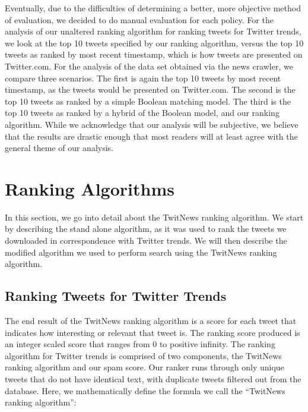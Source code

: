 \documentclass[10pt]{proc}
\begin{document}
  Eventually, due to the difficulties of determining a better, more objective method of evaluation, we decided to do manual evaluation for each policy. For the analysis of our unaltered ranking algorithm for ranking tweets for Twitter trends, we look at the top 10 tweets specified by our ranking algorithm, versus the top 10 tweets as ranked by most recent timestamp, which is how tweets are presented on Twitter.com. For the analysis of the data set obtained via the news crawler, we compare three scenarios. The first is again the top 10 tweets by most recent timestamp, as the tweets would be presented on Twitter.com. The second is the top 10 tweets as ranked by a simple Boolean matching model. The third is the top 10 tweets as ranked by a hybrid of the Boolean model, and our ranking algorithm. While we acknowledge that our analysis will be subjective, we believe that the results are drastic enough that most readers will at least agree with the general theme of our analysis.

\section{Ranking Algorithms}
  
  In this section, we go into detail about the TwitNews ranking algorithm. We start by describing the stand alone algorithm, as it was used to rank the tweets we downloaded in correspondence with Twitter trends. We will then describe the modified algorithm we used to perform search using the TwitNews ranking algorithm.
  
  \subsection{Ranking Tweets for Twitter Trends}
  The end result of the TwitNews ranking algorithm is a score for each tweet that indicates how interesting or relevant that tweet is. The ranking score produced is an integer scaled score that ranges from 0 to positive infinity.  The ranking algorithm for Twitter trends is comprised of two components, the TwitNews ranking algorithm and our spam score.  Our ranker runs through only unique tweets that do not have identical text, with duplicate tweets filtered out from the database. Here, we mathematically define the formula we call the ``TwitNews ranking algorithm'':

  
\end{document}
